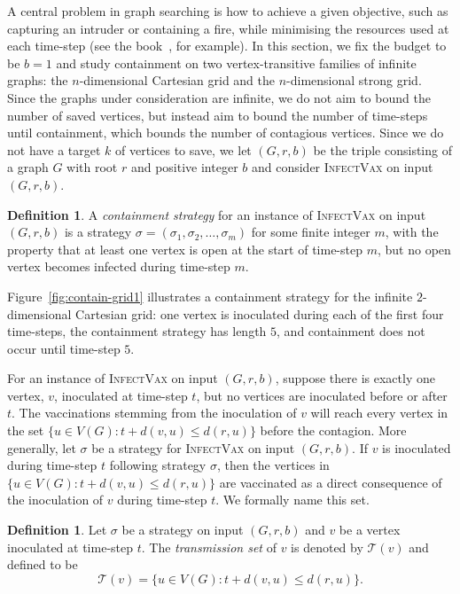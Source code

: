 \documentclass[unknownkeysallowed]{article}
\theoremstyle{definition}\newtheorem{strategy}{Strategy}
\newtheorem{definition}[theorem]{Definition}
\theoremstyle{definition}\newtheorem{notation}{Notation}[theorem]
\newcommand*{\IV}{\textup{\textsc{InfectVax}}\xspace}
\begin{document}
A central problem in graph searching is how to achieve a given objective, such as capturing an intruder or containing a fire, while minimising the resources used at each time-step (see the book~\cite{Bonato_book}, for example).   In this section, we fix the budget to be $b=1$ and study containment on two vertex-transitive families of infinite graphs: the $n$-dimensional Cartesian grid and the $n$-dimensional strong grid.  Since the graphs under consideration are infinite, we do not aim to bound the number of saved vertices, but instead aim to bound the number of time-steps until containment, which bounds the number of contagious vertices.  Since we do not have a target $k$ of vertices to save, we let $(G,r,b)$ be the triple consisting of a graph $G$ with root $r$ and positive integer $b$ and consider \IV on input $(G,r,b)$.

\begin{definition}\label{defn:vaccination_strategy} 
A {\it containment strategy} for an instance of \IV on input $(G,r,b)$ is a strategy $\sigma=(\sigma_1,\sigma_2,\dots,\sigma_m)$ for some finite integer $m$, with the property that at least one vertex is open at the start of time-step $m$, but no open vertex becomes infected during time-step $m$.
\end{definition}

Figure~\ref{fig:contain-grid1} illustrates a containment strategy for the infinite $2$-dimensional Cartesian grid: one vertex is inoculated during each of the first four time-steps, the containment strategy has length $5$, and containment does not occur until time-step $5$.  

For an instance of \IV on input $(G,r,b)$, suppose there is exactly one vertex, $v$, inoculated at time-step $t$, but no vertices are inoculated before or after $t$. The vaccinations stemming from the inoculation of $v$ will reach every vertex in the set $\{u \in V(G) : t+ d(v,u) \leq d(r,u)\}$ before the contagion.  More generally, let $\sigma$ be a strategy for \IV on input $(G,r,b)$.  If $v$ is inoculated during time-step $t$ following strategy $\sigma$, then the vertices in $\{u \in V(G) : t+ d(v,u) \leq d(r,u)\}$ are vaccinated as a direct consequence of the inoculation of $v$ during time-step $t$.  We formally name this set.  

\begin{definition}\label{defn:transmission} Let $\sigma$ be a 
strategy on input $(G,r,b)$ and $v$ be a vertex inoculated at time-step $t$. The {\it transmission set} of $v$ is denoted by $\mathcal{T}(v)$ and defined to be $$\mathcal{T}(v) = \{u \in V(G) : t+ d(v,u) \leq d(r,u)\}.$$
\end{definition} 
\end{document}
